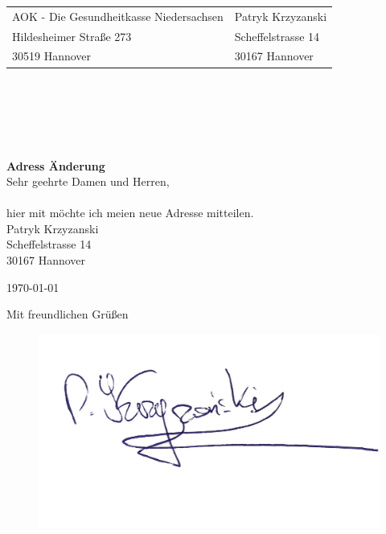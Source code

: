 \documentclass{letter}
\begin{document}
\begin{letter}{}
\begin{tabular}{@{}p{3.0in}l}
AOK - Die Gesundheitkasse Niedersachsen   		& Patryk Krzyzanski\\
Hildesheimer Straße 273 						& Scheffelstrasse 14\\
30519 Hannover									& 30167 Hannover\\
\end{tabular}\\ \\ \\ \\
\bigskip
\\
\Large\textbf{Adress Änderung}\\
\bigskip
\normalsize
Sehr geehrte Damen und Herren, \\\\

hier mit möchte ich meien neue Adresse mitteilen. 
\\

Patryk Krzyzanski\\
Scheffelstrasse 14\\
30167 Hannover\\
\bigskip

\today
 
\closing{Mit freundlichen Grüßen}
\begin{figure}
  \includegraphics[width=0.5\linewidth]{podpis.jpg}
\end{figure}



\end{letter}
\end{document}
